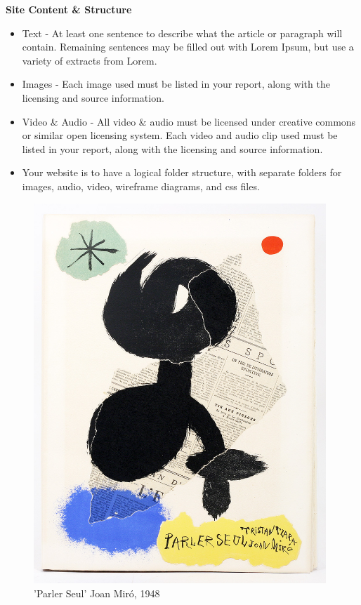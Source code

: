 

\textbf{Site Content \& Structure}

\begin{itemize}
	\item Text - At least one sentence to describe what the article or paragraph will contain.  Remaining sentences may be filled out with Lorem Ipsum, but use a variety of extracts from Lorem.
	\item Images - Each image used must be listed in your report, along with the licensing and source information.   
	\item Video \& Audio - All video \& audio must be licensed under creative commons or similar open licensing system.  Each video and audio clip used must be listed in your report, along with the licensing and source information.
	\item Your website is to have a logical folder structure, with separate folders for images, audio, video, wireframe diagrams, and css files. 
\end{itemize}


\vspace{1cm}
\begin{figure}[h!t]
	\centering
	\includegraphics[width = 11cm]{img/Parler.jpg}
	\caption{'Parler Seul' Joan Mir\'{o}, 1948}
	\label{fig:nikonf3}
\end{figure}

